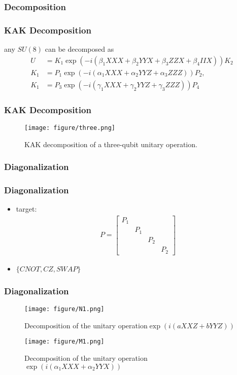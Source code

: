 \documentclass[aspectratio=1610]{beamer}
\begin{document}
\subsubsection{Decomposition}
\begin{frame}
\frametitle{KAK Decomposition\cite{kak}}
any $SU(8)$ can be decomposed as
\begin{align}
  U&=K_{1} \exp \left(-i\left(\beta_{1} XXX+\beta_{2} YYX+\beta_{3} ZZX+\beta_{4} IIX\right)\right) K_{2}\\
  K_{1}&= P_{1}\exp \left(-i\left(\alpha_{1}XXX + \alpha_{2}YYZ + \alpha_{3}ZZZ\right)\right)P_{2},\\
  K_{1}&= P_{3}\exp \left(-i\left(\gamma_{1}XXX + \gamma_{2}YYZ + \gamma_{3}ZZZ\right)\right)P_{4}
\end{align}
\end{frame}
\begin{frame}
\frametitle{KAK Decomposition\cite{kak}}
\begin{figure}
  \texttt{[image: figure/three.png]}
  \caption{KAK decomposition of a three-qubit unitary operation.}
\end{figure}
\end{frame}
\subsubsection{Diagonalization}
\begin{frame}
\frametitle{Diagonalization}
\begin{itemize}
  \item target:
  \begin{align}
    P=\begin{bmatrix}
      P_1 &&\\
      &P_1 &&\\
      &&P_2&\\
      &&&P_2
    \end{bmatrix}
  \end{align}
  \item $\{CNOT,CZ,SWAP\}$
\end{itemize}
\end{frame}

\begin{frame}
  \frametitle{Diagonalization}
  \begin{figure}
    \texttt{[image: figure/N1.png]}
    \caption{Decomposition of the unitary operation$\exp(i(a XXZ+b YYZ))$}
  \end{figure}

  \begin{figure}
    \texttt{[image: figure/M1.png]}
    \caption{Decomposition of the unitary operation $\exp(i(\alpha_1 XXX+\alpha_2 YYX))$}
  \end{figure}
\end{frame}
\end{document}
